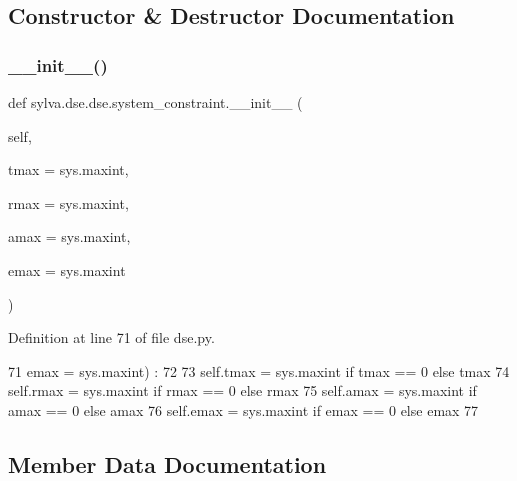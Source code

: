\subsection{Constructor \& Destructor Documentation}
\mbox{\label{classsylva_1_1dse_1_1dse_1_1system__constraint_a523ed20f50972074b7ac58f0512e6a44}} 
\subsubsection{\texorpdfstring{\+\_\+\+\_\+init\+\_\+\+\_\+()}{\_\_init\_\_()}}
{\footnotesize\ttfamily def sylva.\+dse.\+dse.\+system\+\_\+constraint.\+\_\+\+\_\+init\+\_\+\+\_\+ (\begin{DoxyParamCaption}\item[{}]{self,  }\item[{}]{tmax = {\ttfamily sys.maxint},  }\item[{}]{rmax = {\ttfamily sys.maxint},  }\item[{}]{amax = {\ttfamily sys.maxint},  }\item[{}]{emax = {\ttfamily sys.maxint} }\end{DoxyParamCaption})}



Definition at line 71 of file dse.\+py.


\begin{DoxyCode}
71     emax = sys.maxint) :
72 
73     self.tmax = sys.maxint \textcolor{keywordflow}{if} tmax == 0 \textcolor{keywordflow}{else} tmax
74     self.rmax = sys.maxint \textcolor{keywordflow}{if} rmax == 0 \textcolor{keywordflow}{else} rmax
75     self.amax = sys.maxint \textcolor{keywordflow}{if} amax == 0 \textcolor{keywordflow}{else} amax
76     self.emax = sys.maxint \textcolor{keywordflow}{if} emax == 0 \textcolor{keywordflow}{else} emax
77 
\end{DoxyCode}


\subsection{Member Data Documentation}
\mbox{\label{classsylva_1_1dse_1_1dse_1_1system__constraint_a37c94dd85a091ca20492e0fdffde4d52}} 
